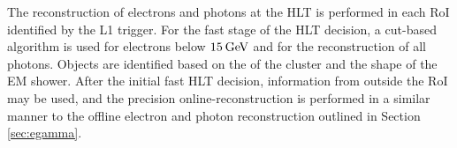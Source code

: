 The reconstruction of electrons and photons at the HLT is performed in each RoI identified by the L1 trigger. For the fast stage of the HLT decision, a cut-based algorithm is used for electrons below $15\hspace{2pt}\text{Ge\kern -0.1em V}$ and for the reconstruction of all photons. Objects are identified based on the \et of the cluster and the shape of the EM shower. %
After the initial fast HLT decision, information from outside the RoI may be used, and the precision online-reconstruction is performed in a similar manner to the offline electron and photon reconstruction outlined in Section \ref{sec:egamma}. %

